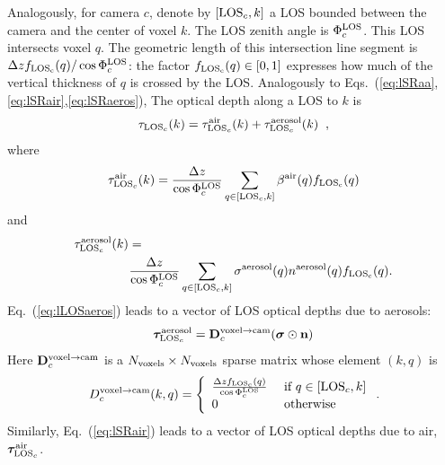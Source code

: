 \documentclass[10pt,twocolumn,letterpaper]{article}
\newcommand{\vect}[1]{\bm{#1}}
\begin{document}
Analogously, for camera $c$, denote by $[{\rm LOS}_c,k]$
a LOS bounded between the camera and the center of voxel $k$. The LOS zenith angle is $\Phi^{\rm LOS}_c$.
This LOS intersects voxel $q$. The geometric length of this intersection
line segment is $\Delta z f_{\rm LOS_c}(q)/\cos\Phi^{\rm LOS}_c$: the factor
$f_{\rm LOS_c}(q)\in [0,1]$ expresses how much of the vertical thickness of $q$ is crossed by the LOS.
Analogously to Eqs.~(\ref{eq:lSRaa},\ref{eq:lSRair},\ref{eq:lSRaeros}),
The optical depth %
along a LOS to $k$ is
\begin{equation}
  \tau_{{\rm LOS}_c}(k)=
   \tau_{{\rm LOS}_c}^{\rm air}(k) +  \tau_{{\rm LOS}_c}^{\rm aerosol}(k)
  \;\;,
  \label{eq:lLOSaerot}
\end{equation}
where
\begin{equation}
  \tau_{{\rm LOS}_c}^{\rm air}(k)=\frac{\Delta z}{\cos\Phi^{\rm LOS}_c}
     \sum_{q \in[{\rm LOS}_c,k]}
     \beta^{\rm air}(q)  f_{\rm LOS_c}(q)
  \label{eq:lLOSair}
\end{equation}
and
\begin{align}
  \label{eq:lLOSaeros}
  \tau_{{\rm LOS}_c}^{\rm aerosol}(k)=
  ~~~~~~~~~~~~~~~~~~~~~~~~~~~~~~~~~~~~~
  ~~~~~~~~~~~~~~~~~~%
  ~~~~~
  \\
   \frac{\Delta z}{\cos\Phi^{\rm LOS}_c}
     \sum_{q \in[{\rm LOS}_c,k]}
     \sigma^{\rm aerosol}(q) n^{\rm aerosol}(q) f_{\rm LOS_c}(q).
     \nonumber
\end{align}
Eq.~(\ref{eq:lLOSaeros}) leads to a vector of LOS optical depths due to aerosols:
\begin{equation}
  \vect{\tau}_{{\rm LOS}_c}^{\rm aerosol}=
  {\bf D}^{\mathrm{voxel \rightarrow cam}}_c
     (\vect{\sigma} \odot {\bf n})
  \label{eq:tauLOSvec1}
\end{equation}
Here ${\bf D}^{\mathrm{voxel \rightarrow cam}}_c$ is a
$N_{\rm voxels}\times N_{\rm voxels}$ sparse matrix whose element $(k,q)$ is
\begin{equation}
  D^{\mathrm{voxel \rightarrow cam}}_c(k,q) =
  \left\{
      \begin{array}{ll}
          \frac{\Delta z f_{\rm LOS_c}(q)}{\cos\Phi^{\rm LOS}_c}
                & \mbox{ if $q \in[{\rm LOS}_c,k]$} \\
          0  & \mbox{ otherwise}
    \label{eq:Dvc}
       \end{array}
  \right.
  .
  \hspace{-0.05cm}
\end{equation}
Similarly, Eq.~(\ref{eq:lSRair}) leads to a vector of LOS optical depths due to air,
$\vect{\tau}_{{\rm LOS}_c}^{\rm air}$.
\end{document}
